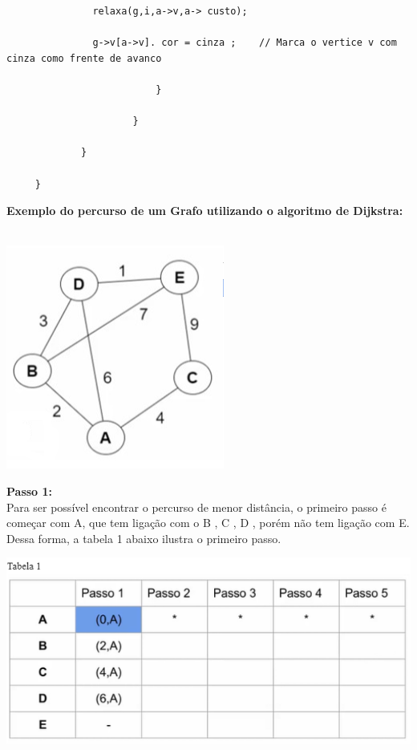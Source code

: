 \documentclass[11pt]{article} %
\begin{document}
\begin{enumerate}[a)]
\begin{lstlisting}
               relaxa(g,i,a->v,a-> custo); 

               g->v[a->v]. cor = cinza ; 	// Marca o vertice v com cinza como frente de avanco

                          }

                      }

             }

     }
\end{lstlisting}

\newpage

{\bf Exemplo do percurso de um Grafo utilizando o algoritmo de Dijkstra: } \\ \\

		\begin{center}
			\includegraphics[scale = 1]{q2e.png}
		\end{center}

{\bf Passo 1:} \\

Para ser possível encontrar o percurso de menor distância, o primeiro passo é começar com A, que tem ligação com o B , C , D , porém não tem ligação com E. \\ Dessa forma, a tabela 1 abaixo ilustra o primeiro passo. \\

		\begin{center}
			\includegraphics[scale = 0.9]{q2e1.png}
		\end{center}


\end{enumerate}
\end{document}
